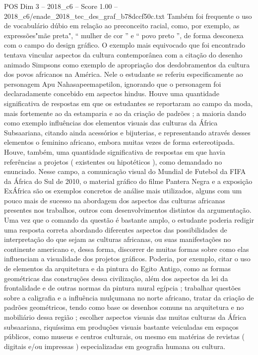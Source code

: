\begin{textsample}{POS Dim 3 – 2018\_c6 – Score 1.00 – 2018\_c6/enade\_2018\_tec\_des\_graf\_b78dccf50c.txt}
Também foi frequente o uso de vocabulário dúbio em relação ao preconceito racial, como, por exemplo, as expressões"mãe preta", “ mulher de cor ” e “ povo preto ”, de forma desconexa com o campo do design gráfico.
O exemplo mais equivocado que foi encontrado tentava vincular aspectos da cultura contemporânea com a citação do desenho animado Simpsons como exemplo de apropriação dos desdobramentos da cultura dos povos africanos na América.
Nele o estudante se referiu especificamente ao personagem Apu Nahasapeemapetilon, ignorando que o personagem foi declaradamente concebido em aspectos hindus.
Houve uma quantidade significativa de respostas em que os estudantes se reportaram ao campo da moda, mais fortemente ao da estamparia e ao da criação de padrões ; a maioria dando como exemplo influências dos elementos visuais das culturas da África Subsaariana, citando ainda acessórios e bijuterias, e representando através desses elementos o feminino africano, embora muitas vezes de forma estereotipada.
Houve, também, uma quantidade significativa de respostas em que havia referências a projetos ( existentes ou hipotéticos ), como demandado no enunciado.
Nesse campo, a comunicação visual do Mundial de Futebol da FIFA da África do Sul de 2010, o material gráfico do filme Pantera Negra e a exposição ExÁfrica são os exemplos concretos de análise mais utilizados, alguns com um pouco mais de sucesso na abordagem dos aspectos das culturas africanas presentes nos trabalhos, outros com desenvolvimentos distintos da argumentação.
Uma vez que o comando da questão é bastante amplo, o estudante poderia redigir uma resposta correta abordando diferentes aspectos das possibilidades de interpretação do que sejam as culturas africanas, ou suas manifestações no continente americano e, dessa forma, discorrer de muitas formas sobre como elas influenciam a visualidade dos projetos gráficos.
Poderia, por exemplo, citar o uso de elementos da arquitetura e da pintura do Egito Antigo, como as formas geométricas das construções dessa civilização, além dos aspectos da lei da frontalidade e de outras normas da pintura mural egípcia ; trabalhar questões sobre a caligrafia e a influência mulçumana no norte africano, tratar da criação de padrões geométricos, tendo como base os desenhos comuns na arquitetura e no mobiliário dessa região ; escolher aspectos visuais das muitas culturas da África subsaariana, riquíssima em produções visuais bastante veiculadas em espaços públicos, como museus e centros culturais, ou mesmo em matérias de revistas ( digitais e/ou impressas ) especializadas em geografia humana ou cultura.

\end{textsample}
